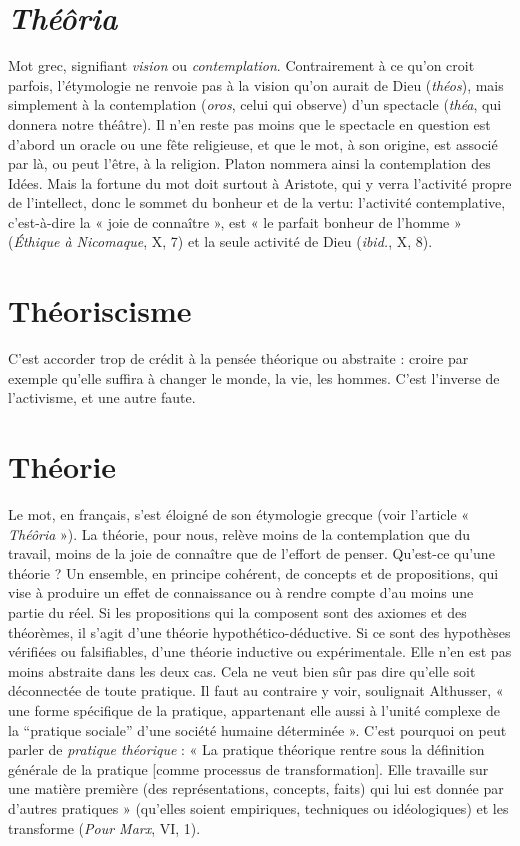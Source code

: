 \section{{\it Théôria}}
Mot grec, signifiant {\it vision} ou {\it contemplation}. Contrairement à ce
qu’on croit parfois, l’étymologie ne renvoie pas à la vision qu’on
aurait de Dieu ({\it théos}), mais simplement à la contemplation ({\it oros}, celui qui
observe) d’un spectacle ({\it théa}, qui donnera notre théâtre). Il n’en reste pas
moins que le spectacle en question est d’abord un oracle ou une fête religieuse,
et que le mot, à son origine, est associé par là, ou peut l'être, à la religion.
Platon nommera ainsi la contemplation des Idées. Mais la fortune du mot doit
surtout à Aristote, qui y verra l’activité propre de l’intellect, donc le sommet du
bonheur et de la vertu: l’activité contemplative, c’est-à-dire la « joie de
connaître », est « le parfait bonheur de l’homme » ({\it Éthique à Nicomaque}, X, 7)
et la seule activité de Dieu ({\it ibid.}, X, 8).

\section{Théoriscisme}
C'est accorder trop de crédit à la pensée théorique ou
abstraite : croire par exemple qu’elle suffira à changer le
monde, la vie, les hommes. C’est l’inverse de l’activisme, et une autre faute.

\section{Théorie}
Le mot, en français, s’est éloigné de son étymologie grecque (voir
l'article « {\it Théôria} »). La théorie, pour nous, relève moins de la
contemplation que du travail, moins de la joie de connaître que de l'effort de
penser. Qu’est-ce qu’une théorie ? Un ensemble, en principe cohérent, de concepts
et de propositions, qui vise à produire un effet de connaissance ou à
rendre compte d’au moins une partie du réel. Si les propositions qui la composent
sont des axiomes et des théorèmes, il s’agit d’une théorie hypothético-déductive.
Si ce sont des hypothèses vérifiées ou falsifiables, d’une théorie
inductive ou expérimentale. Elle n’en est pas moins abstraite dans les deux cas.
Cela ne veut bien sûr pas dire qu’elle soit déconnectée de toute pratique. Il faut
au contraire y voir, soulignait Althusser, « une forme spécifique de la pratique,
appartenant elle aussi à l’unité complexe de la “pratique sociale” d’une société
humaine déterminée ». C’est pourquoi on peut parler de {\it pratique théorique} : « La
pratique théorique rentre sous la définition générale de la pratique [comme processus
de transformation]. Elle travaille sur une matière première (des représentations,
concepts, faits) qui lui est donnée par d’autres pratiques » (qu’elles soient
empiriques, techniques ou idéologiques) et les transforme ({\it Pour Marx}, VI, 1).

